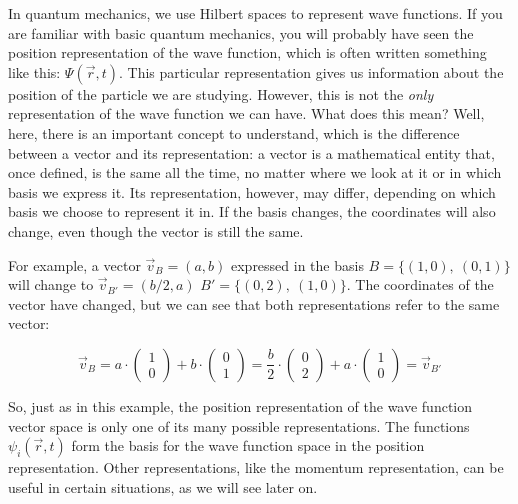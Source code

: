 In quantum mechanics, we use Hilbert spaces to represent wave functions. If you are familiar with basic quantum mechanics, you will probably have seen the position representation of the wave function, which is often written something like this: $\Psi\left(\vec{r}, t\right)$. This particular representation gives us information about the position of the particle we are studying. However, this is not the \textit{only} representation of the wave function we can have. What does this mean? Well, here, there is an important concept to understand, which is the difference between a vector and its representation: a vector is a mathematical entity that, once defined, is the same all the time, no matter where we look at it or in which basis we express it. Its representation, however, may differ, depending on which basis we choose to represent it in. If the basis changes, the coordinates will also change, even though the vector is still the same.

For example, a vector $\vec{v}_B = (a, b)$ expressed in the basis $B=\{(1, 0),\ (0, 1)\}$ will change to $\vec{v}_{B'} = (b/2, a)$ $B'=\{(0, 2),\ (1, 0)\}$. The coordinates of the vector have changed, but we can see that both representations refer to the same vector:

\begin{equation}
    \vec{v}_B = a\cdot \begin{pmatrix}
        1 \\ 0
    \end{pmatrix} + b \cdot \begin{pmatrix}
        0 \\ 1
    \end{pmatrix} = 
    \frac{b}{2}\cdot \begin{pmatrix}
        0 \\ 2
    \end{pmatrix} + a \cdot \begin{pmatrix}
        1 \\ 0
    \end{pmatrix} = \vec{v}_{B'}
\end{equation}

So, just as in this example, the position representation of the wave function vector space is only one of its many possible representations. The functions $\psi_i\left(\vec{r}, t\right)$ form the basis for the wave function space in the position representation. Other representations, like the momentum representation, can be useful in certain situations, as we will see later on.


